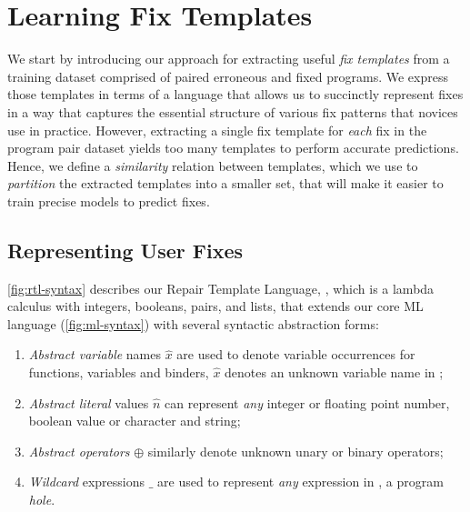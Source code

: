 \section{Learning Fix Templates}
\label{sec:templ-partition}

We start by introducing our approach for extracting useful \emph{fix templates}
from a training dataset comprised of paired erroneous and fixed programs.
%
We express those templates in terms of a language that allows us to succinctly
represent fixes in a way that captures the essential structure of various fix
patterns that novices use in practice.
%
However, extracting a single fix template for \emph{each} fix in the program
pair dataset yields too many templates to perform accurate predictions.
%
Hence, we define a \emph{similarity} relation between templates, which we use to
\emph{partition} the extracted templates into a smaller set, that will make it
easier to train precise models to predict fixes.



\subsection{Representing User Fixes}
\label{sec:templ-partition:lang}

\autoref{fig:rtl-syntax} describes our Repair Template Language, \repairLang,
which is a lambda calculus with integers, booleans, pairs, and lists, that
extends our core ML language \lang (\autoref{fig:ml-syntax}) with several
syntactic abstraction forms:

\begin{enumerate}
    \item \emph{Abstract variable} names $\hat{x}$  are used to denote variable
    occurrences for functions, variables and binders, \ie $\hat{x}$ denotes
    an unknown variable name in \repairLang;

    \item \emph{Abstract literal} values $\hat{n}$ can represent \emph{any}
    integer or floating point number, boolean value or character and string;

    \item \emph{Abstract operators} $\oplus$ similarly denote unknown unary or
    binary operators;

    \item \emph{Wildcard} expressions $\_$ are used to represent \emph{any}
    expression in \repairLang, \ie a program \emph{hole}.
\end{enumerate}

